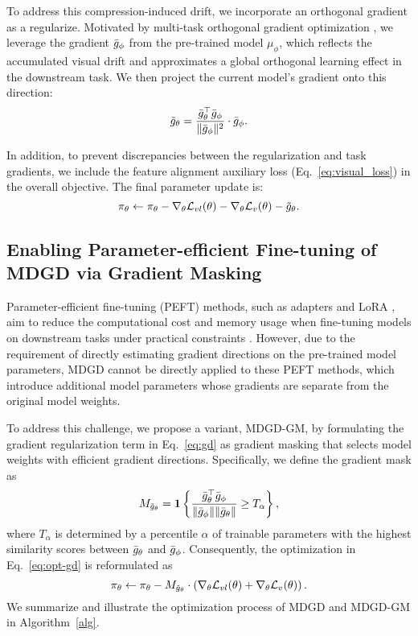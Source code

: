 To address this compression-induced drift, we incorporate an orthogonal gradient as a regularize. 
Motivated by multi-task orthogonal gradient optimization \cite{yu2020gradient, zhu2022gradient, dong2022gdod}, 
we leverage the gradient $\Bar{g}_\phi$ from the pre-trained model $\mu_\phi$, which reflects the accumulated visual drift and approximates a global orthogonal learning effect in the downstream task. 
We then project the current model’s gradient onto this direction:
\begin{equation}\label{eq:gd}
    \Tilde{g}_\theta = \frac{\Bar{g}_\theta^\top \Bar{g}_\phi}{\|\Bar{g}_\phi\|^2}\cdot \Bar{g}_\phi.
\end{equation}

In addition, to prevent discrepancies between the regularization and task gradients, we include the feature alignment auxiliary loss (Eq.~\eqref{eq:visual_loss}) in the overall objective. The final parameter update is:
\begin{equation}\label{eq:opt-gd}
    \pi_\theta \leftarrow \pi_\theta - \nabla_\theta\mathcal{L}_{vl}(\theta) - \nabla_\theta\mathcal{L}_v(\theta) - \Tilde{g}_\theta.
\end{equation}

\subsection{Enabling Parameter-efficient Fine-tuning of MDGD via Gradient Masking}
Parameter-efficient fine-tuning (PEFT) methods, such as adapters \cite{houlsby2019parameter} and LoRA \cite{hu2021lora}, aim to reduce the computational cost and memory usage when fine-tuning models on downstream tasks under practical constraints \cite{han2024parameter}. 
However, due to the requirement of directly estimating gradient directions on the pre-trained model parameters, MDGD cannot be directly applied to these PEFT methods, which introduce additional model parameters whose gradients are separate from the original model weights. 

To address this challenge, we propose a variant, MDGD-GM, by formulating the gradient regularization term in Eq.~\eqref{eq:gd} as gradient masking that selects model weights with efficient gradient directions. Specifically, we define the gradient mask as
\begin{equation}\label{eq:masking}
    M_{\Tilde{g}_\theta} = \mathbf{1}\left\{\frac{\Bar{g}_\theta^\top \Bar{g}_\phi}{\|\Bar{g}_\phi\| \|\Bar{g}_\theta\|} \geq T_\alpha \right\},
\end{equation}
where $T_\alpha$ is determined by a percentile $\alpha$ of trainable parameters with the highest similarity scores between $\Bar{g}_\theta$ and $\Bar{g}_\phi$. Consequently, the optimization in Eq.~\eqref{eq:opt-gd} is reformulated as
\begin{equation}\label{eq:opt-mask}
    \pi_\theta \leftarrow \pi_\theta - M_{\Tilde{g}_\theta} \cdot \left(\nabla_\theta\mathcal{L}_{vl}(\theta) + \nabla_\theta\mathcal{L}_v(\theta)\right).
\end{equation}
We summarize and illustrate the optimization process of MDGD and MDGD-GM in Algorithm~\ref{alg}.
